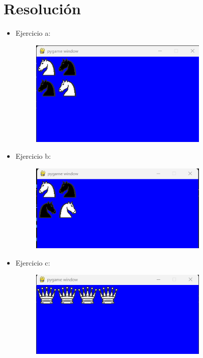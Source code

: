 \documentclass{article}
\begin{document}
	\section{Resolución}
	\begin{itemize}
		\item Ejercicio a: 
	\begin{figure}[H]
		\centering
		\includegraphics[width=0.8\textwidth,keepaspectratio]{img/ejercicio2.png}
	\end{figure}
	\end{itemize}
 \begin{itemize}
		\item Ejercicio b:
	\begin{figure}[H]
		\centering
		\includegraphics[width=0.8\textwidth,keepaspectratio]{img/ejercicio2b.png}
	\end{figure}
	\end{itemize}
 \begin{itemize}
		\item Ejercicio c:
	\begin{figure}[H]
		\centering
		\includegraphics[width=0.8\textwidth,keepaspectratio]{img/ejercicio2c.png}
	\end{figure}
	\end{itemize}
\end{document}
